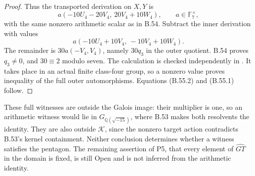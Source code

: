 \begin{proof}
Thus the transported derivation on $X,Y$ is
\[
       a(-10U_4-20V_4,\ 20V_4+10W_4),
                       \qquad a\in\mathbb F_7^\times,     \tag{B.55.10}
\]
with the same nonzero arithmetic scalar as in B.54.
Subtract the inner derivation with values
\[
                   a(-10U_4+10V_4,\ -10V_4+10W_4).
\]
The remainder is $30a(-V_4,V_4)$, namely $30q_3$ in the
outer quotient. B.54 proves $q_3\ne0$, and $30\equiv2$
modulo seven. The calculation is checked independently
in .
It takes place in an actual finite class-four group,
so a nonzero value proves inequality of the full outer
automorphisms. Equations (B.55.2) and (B.55.1) follow.
\end{proof}

These full witnesses are outside the Galois image: their
multiplier is one, so an arithmetic witness would lie in
$G_{\mathbb Q(\sqrt{-15})}$, where B.53 makes both
resolvents the identity. They are also outside
$\mathcal K$, since the nonzero target action contradicts
B.53's kernel containment. Neither conclusion determines
whether a witness satisfies the pentagon. The remaining
assertion of P5, that every element of $\widehat{GT}$ in
the domain is fixed, is still Open and is not inferred
from the arithmetic identity.
